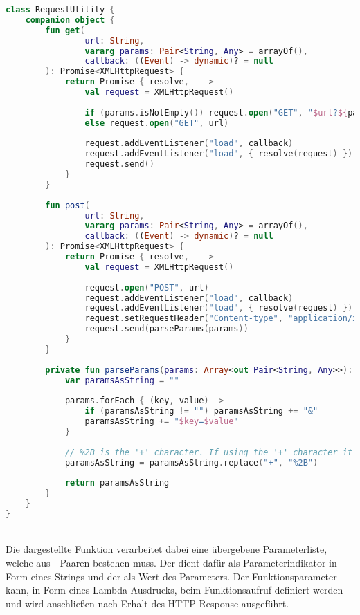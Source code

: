\begin{lstlisting}[style=lstStyleFramed, language=Kotlin, caption={Implementierung der Request-Methoden \code{GET} und \code{POST}, inklusiver der Parameterverarbeitung}, label=lst:requestUtility, float]
class RequestUtility {
	companion object {
		fun get(
				url: String, 
				vararg params: Pair<String, Any> = arrayOf(), 
				callback: ((Event) -> dynamic)? = null
		): Promise<XMLHttpRequest> {
			return Promise { resolve, _ ->
				val request = XMLHttpRequest()
				
				if (params.isNotEmpty()) request.open("GET", "$url?${parseParams(params)}")
				else request.open("GET", url)
				
				request.addEventListener("load", callback)
				request.addEventListener("load", { resolve(request) })
				request.send()
			}
		}
	
		fun post(
				url: String, 
				vararg params: Pair<String, Any> = arrayOf(), 
				callback: ((Event) -> dynamic)? = null
		): Promise<XMLHttpRequest> {
			return Promise { resolve, _ ->
				val request = XMLHttpRequest()
				
				request.open("POST", url)
				request.addEventListener("load", callback)
				request.addEventListener("load", { resolve(request) })
				request.setRequestHeader("Content-type", "application/x-www-form-urlencoded")
				request.send(parseParams(params))
			}
		}
	
		private fun parseParams(params: Array<out Pair<String, Any>>): String {
			var paramsAsString = ""
			
			params.forEach { (key, value) ->
				if (paramsAsString != "") paramsAsString += "&"
				paramsAsString += "$key=$value"
			}
			
			// %2B is the '+' character. If using the '+' character it will parse into a space character
			paramsAsString = paramsAsString.replace("+", "%2B")
			
			return paramsAsString
		}
	}
}
\end{lstlisting}
\\
Die dargestellte Funktion  verarbeitet dabei eine übergebene Parameterliste, welche aus --Paaren bestehen muss. Der  dient dafür als Parameterindikator in Form eines Strings und der  als Wert des Parameters. Der Funktionsparameter  kann, in Form eines Lambda-Ausdrucks, beim Funktionsaufruf definiert werden und wird anschließen nach Erhalt des \gls{HTTP}-Response ausgeführt.\\
